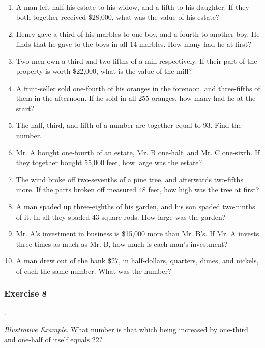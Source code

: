 \documentclass{book}
\begin{document}
\begin{enumerate}
\item A man left half his estate to his widow, and a fifth to his
daughter. If they both together received \$28,000, what was the
value of his estate?

\item Henry gave a third of his marbles to one boy, and a fourth
to another boy. He finds that he gave to the boys in all 14
marbles. How many had he at first?

\item Two men own a third and two-fifths of a mill respectively.
If their part of the property is worth \$22,000, what is the value
of the mill?

\item A fruit-seller sold one-fourth of his oranges in the
forenoon, and three-fifths of them in the afternoon. If he sold in
all 255 oranges, how many had he at the start?

\item The half, third, and fifth of a number are together equal to
93. Find the number.

\item Mr. A bought one-fourth of an estate, Mr. B one-half, and
Mr. C one-sixth. If they together bought 55,000 feet, how large
was the estate?

\item The wind broke off two-sevenths of a pine tree, and
afterwards two-fifths more. If the parts broken off measured 48
feet, how high was the tree at first?

\item A man spaded up three-eighths of his garden, and his son
spaded two-ninths of it. In all they spaded 43 square rods. How
large was the garden?

\item Mr. A's investment in business is \$15,000 more than Mr.
B's. If Mr. A invests three times as much as Mr. B, how much is
each man's investment?

\item A man drew out of the bank \$27, in half-dollars, quarters,
dimes, and nickels, of each the same number. What was the number?
\end{enumerate}

\subsubsection*{Exercise 8}.

\textit{ Illustrative Example}. What number is that which being
increased by one-third and one-half of itself equals 22?
\end{document}
